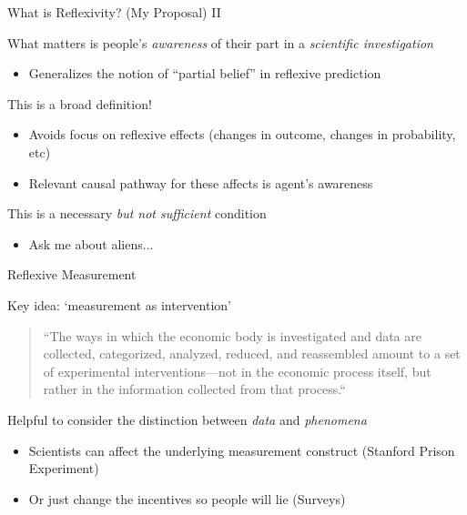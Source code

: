\documentclass[aspectratio=169,xcolor=dvipsnames]{beamer}
\begin{document}
\begin{frame}{What is Reflexivity? (My Proposal) II}

{\color{red}What matters is people's \textit{awareness} of their part in a \textit{scientific investigation}}
\begin{itemize}
    \item Generalizes the notion of ``partial belief'' in reflexive prediction \autocite[484]{grunberg1986}
\end{itemize}

\vspace{5mm}
This is a broad definition! 
\begin{itemize}
    \item Avoids focus on reflexive effects (changes in outcome, changes in probability, etc)
    \item Relevant causal pathway for these affects is agent's awareness
\end{itemize}

\vspace{5mm}
This is a necessary \textit{but not sufficient} condition
\begin{itemize}
    \item Ask me about aliens...
\end{itemize}

\end{frame}



\begin{frame}{Reflexive Measurement}

{\color{red}Key idea: `measurement as intervention' \autocite{morgan2001}}

\vspace{5mm}
\begin{quote}     
    ``The ways in which the economic body is investigated and data are collected, categorized, analyzed, reduced, and reassembled amount to a set of experimental interventions---not in the economic process itself, but rather in the information collected from that process.`` \autocite[p237]{morgan2001}
\end{quote}

\vspace{5mm}
Helpful to consider the distinction between \textit{data} and \textit{phenomena} \autocite{woodward1989}
\begin{itemize}
    \item Scientists can affect the underlying measurement construct (Stanford Prison Experiment)
    \item Or just change the incentives so people will lie (Surveys)
\end{itemize}

\end{frame}
\end{document}
